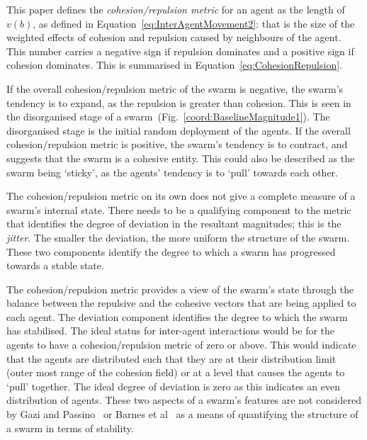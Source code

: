\documentclass{ieeeaccess}
\begin{document}


This paper defines the \textit{cohesion/repulsion metric} for an agent as the
length of $v(b)$,  as defined in Equation~\ref{eq:InterAgentMovement2}: that is
the size of the weighted effects of cohesion and repulsion caused by neighbours of the
agent. This number carries a negative sign if repulsion dominates and a
positive sign if cohesion dominates. This is summarised in
Equation~\ref{eq:CohesionRepulsion}.

If the overall cohesion/repulsion metric of the swarm is negative, the
swarm's tendency is to expand, as the repulsion is greater than cohesion. This is
seen in the disorganised stage of a
swarm~(Fig.~\ref{coord:BaselineMagnitude1}). The disorganised stage is the
initial random deployment of the agents. If the overall cohesion/repulsion
metric is positive, the swarm's tendency is to contract, and
suggests that the swarm is a cohesive entity. This could also be described as
the swarm being `sticky', as the agents' tendency is to `pull' towards each
other.

The cohesion/repulsion metric on its own does not give a complete
measure of a swarm's internal state. There needs to be a qualifying component
to the metric that identifies the degree of deviation in the resultant
magnitudes; this is the \textit{jitter}. The smaller the deviation, the more
uniform the structure of the swarm. These two components identify the degree to
which a swarm has progressed towards a stable state.
 
The cohesion/repulsion metric provides a view of the swarm's state
through the balance between the repulsive and the cohesive vectors that are
being applied to each agent. The deviation component identifies the degree to
which the swarm has stabilised. The ideal status for inter-agent interactions
would be for the agents to have a cohesion/repulsion metric of zero
or above. This would indicate that the agents are distributed such that they
are at their distribution limit (outer most range of the cohesion field) or at
a level that causes the agents to `pull' together. The ideal degree of
deviation is zero as this indicates an even distribution of agents. These two
aspects of a swarm's features are not considered by Gazi and
Passino~\cite{GP:11} or Barnes et al~\cite{BFV:07} as a means of quantifying
the structure of a swarm in terms of stability.
\end{document}
